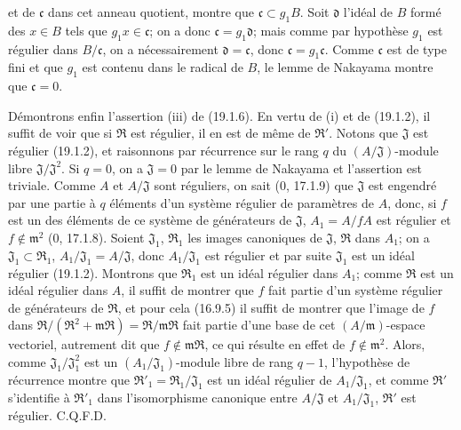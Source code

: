 
et de $\mathfrak c$ dans cet anneau quotient, montre que $\mathfrak c\subset g_1B$. Soit $\mathfrak d$ l'idéal de $B$ formé des $x\in B$ tels que $g_1x\in\mathfrak c$; on a donc $\mathfrak c=g_1\mathfrak d$; mais comme par hypothèse $g_1$ est régulier dans $B/\mathfrak c$, on a nécessairement $\mathfrak d=\mathfrak c$, donc $\mathfrak c=g_1\mathfrak c$. Comme $\mathfrak c$ est de type fini et que $g_1$ est contenu dans le radical de $B$, le lemme de Nakayama montre que $\mathfrak c=0$.

Démontrons enfin l'assertion (iii) de (19.1.6). En vertu de (i) et de (19.1.2), il suffit de voir que si $\mathfrak R$ est régulier, il en est de même de $\mathfrak R'$. Notons que $\mathfrak J$ est régulier (19.1.2), et raisonnons par récurrence sur le rang $q$ du $(A/\mathfrak J)$-module libre $\mathfrak J/\mathfrak J^2$. Si $q=0$, on a $\mathfrak J=0$ par le lemme de Nakayama et l'assertion est triviale. Comme $A$ et $A/\mathfrak J$ sont réguliers, on sait ($0$, 17.1.9) que $\mathfrak J$ est engendré par une partie à $q$ éléments d'un système régulier de paramètres de $A$, donc, si $f$ est un des éléments de ce système de générateurs de $\mathfrak J$, $A_1=A/fA$ est régulier et $f\notin\mathfrak m^2$ ($0$, 17.1.8). Soient $\mathfrak J_1$, $\mathfrak R_1$ les images canoniques de $\mathfrak J$, $\mathfrak R$ dans $A_1$; on a $\mathfrak J_1\subset\mathfrak R_1$, $A_1/\mathfrak J_1=A/\mathfrak J$, donc $A_1/\mathfrak J_1$ est régulier et par suite $\mathfrak J_1$ est un idéal régulier (19.1.2). Montrons que $\mathfrak R_1$ est un idéal régulier dans $A_1$; comme $\mathfrak R$ est un idéal régulier dans $A$, il suffit de montrer que $f$ fait partie d'un système régulier de générateurs de $\mathfrak R$, et pour cela (16.9.5) il suffit de montrer que l'image de $f$ dans $\mathfrak R/(\mathfrak R^2+\mathfrak m\mathfrak R)=\mathfrak R/\mathfrak m\mathfrak R$ fait partie d'une base de cet $(A/\mathfrak m)$-espace vectoriel, autrement dit que $f\notin\mathfrak m\mathfrak R$, ce qui résulte en effet de $f\notin\mathfrak m^2$. Alors, comme $\mathfrak J_1/\mathfrak J_1^2$ est un $(A_1/\mathfrak J_1)$-module libre de rang $q-1$, l'hypothèse de récurrence montre que $\mathfrak R'_1=\mathfrak R_1/\mathfrak J_1$ est un idéal régulier de $A_1/\mathfrak J_1$, et comme $\mathfrak R'$ s'identifie à $\mathfrak R'_1$ dans l'isomorphisme canonique entre $A/\mathfrak J$ et $A_1/\mathfrak J_1$, $\mathfrak R'$ est régulier. C.Q.F.D.

